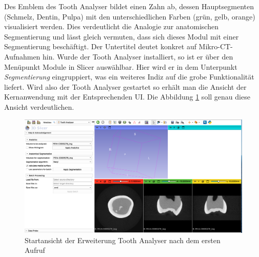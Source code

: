 Des Emblem des Tooth Analyser bildet einen Zahn ab, dessen Hauptsegmenten (Schmelz,
Dentin, Pulpa) mit den unterschiedlichen Farben (grün, gelb, orange) visualisiert
werden. Dies verdeutlicht die Analogie zur anatomischen Segmentierung und lässt
gleich vermuten, dass sich dieses Modul mit einer Segmentierung beschäftigt. Der
Untertitel deutet konkret auf Mikro-\ac{CT}-Aufnahmen hin. Wurde der Tooth
Analyser installiert, so ist er über den Menüpunkt Module in Slicer auswählbar.
Hier wird er in dem Unterpunkt \textit{Segmentierung} eingruppiert, was ein
weiteres Indiz auf die grobe Funktionalität liefert. Wird also der Tooth Analyser
gestartet so erhält man die Ansicht der Kernanwendung mit der Entsprechenden \ac{UI}.
Die Abbildung \ref{fig:tooth_analyser_start_up} soll genau diese Ansicht verdeutlichen.

\begin{figure}[h]
	\centering
	\includegraphics[scale=0.2, width=\textwidth]{img/toothAnalyserStarUp.png}
	\caption{Startansicht der Erweiterung Tooth Analyser nach dem ersten Aufruf}
	\label{fig:tooth_analyser_start_up}
\end{figure}


